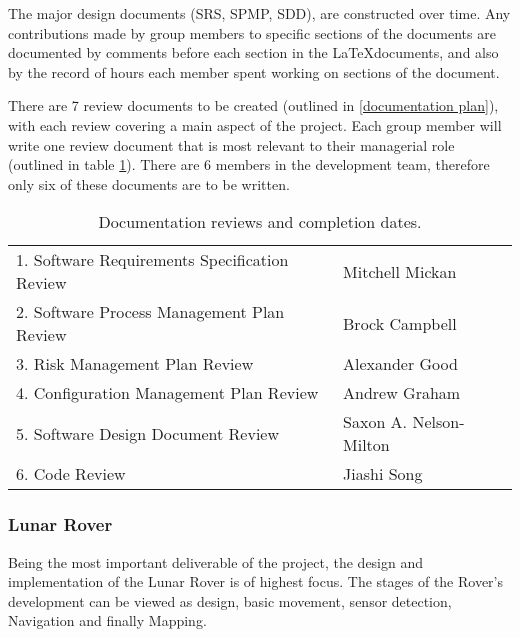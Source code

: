 \documentclass{article}
\newcounter{subsubsubsection}[subsubsection]
\begin{document}
\begin{adjustwidth}{3em}{0pt}
The major design documents (SRS, SPMP, SDD), are constructed over time. Any contributions made by group members to specific sections of the documents are documented by comments before each section in the \LaTeX documents, and also by the record of hours each member spent working on sections of the document.
\end{adjustwidth}

\begin{adjustwidth}{3em}{0pt}
There are 7 review documents to be created (outlined in \ref{documentation plan}), with each review covering a main aspect of the project. Each group member will write one review document that is most relevant to their managerial role (outlined in table \ref{table:review documents}). There are 6 members in the development team, therefore only six of these documents are to be written. 

\begin{table}[H]
 \caption{Documentation reviews and completion dates.}
  \label{table:review documents}
  \centering
  \begin{tabular}{|l|l|}
  \hline
    1. Software Requirements Specification Review & Mitchell Mickan \\
    2. Software Process Management Plan Review & Brock Campbell \\
    3. Risk Management Plan Review & Alexander Good \\
    4. Configuration Management Plan Review & Andrew Graham \\
    5. Software Design Document Review & Saxon A. Nelson-Milton \\
    6. Code Review & Jiashi Song \\
    \hline
  \end{tabular}
 
\end{table}
\end{adjustwidth}

\subsubsection{Lunar Rover}
\begin{adjustwidth}{2em}{0pt}
	Being the most important deliverable of the project, the design and implementation of the Lunar Rover is of highest focus. The stages of the Rover's  development can be viewed as design, basic movement, sensor detection, Navigation and finally Mapping.  %
\end{adjustwidth}
\end{document}
